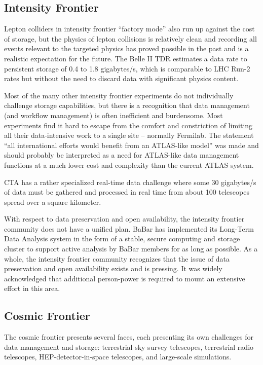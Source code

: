 \subsection{Intensity Frontier}
Lepton colliders in intensity frontier ``factory mode'' also run up against the cost of storage, 
but the physics of lepton collisions is relatively clean and recording all events relevant to the 
targeted physics has proved possible in the past and is a realistic expectation for the future.  
The Belle II TDR estimates a data rate to persistent storage of 0.4 to 1.8 gigabytes/s, which is 
comparable to LHC Run-2 rates but without the need to discard data with significant physics content.

Most of the many other intensity frontier experiments do not individually challenge storage 
capabilities, but there is a recognition that data management (and workflow management) is 
often inefficient and burdensome. Most experiments find it hard to escape from the comfort 
and constriction of limiting all their data-intensive work to a single site -- normally Fermilab. 
The statement ``all international efforts would benefit from an ATLAS-like model'' was made and 
should probably be interpreted as a need for ATLAS-like data management functions at a much 
lower cost and complexity than the current ATLAS system.

CTA has a rather specialized real-time data challenge where some 30 gigabytes/s of data 
must be gathered and processed in real time from about 100 telescopes spread over a square kilometer.

With respect to data preservation and open availability, the intensity frontier community 
does not have a unified plan.  BaBar has implemented its Long-Term Data Analysis system in 
the form of a stable, secure computing and storage cluster to support active analysis by 
BaBar members for as long as possible. As a whole, the intensity frontier community recognizes 
that the issue of data preservation and open availability exists and is pressing. It was widely 
acknowledged that additional person-power is required to mount an extensive effort in this area.

\subsection{Cosmic Frontier}
The cosmic frontier presents several faces, each presenting its own challenges for data 
management and storage: terrestrial sky survey telescopes, terrestrial radio telescopes, 
HEP-detector-in-space telescopes, and large-scale simulations.

